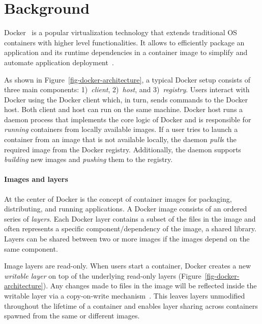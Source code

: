 \section{Background}
\label{sec:background}

Docker~\cite{docker} is a popular virtualization technology
that extends traditional OS containers with higher level
functionalities.
%
It allows to efficiently package an application and its runtime dependencies
in a container image to simplify and automate application deployment~\cite{slacker}.
%
%

%
As shown in Figure~\ref{fig-docker-architecture}, a typical
Docker setup consists of three main components: 1)~\emph{client},
2)~\emph{host}, and 3)~\emph{registry}.
%
Users interact with Docker using the Docker client which, in turn,
sends commands to the Docker host.
%
Both client and host can run on the same machine.
%
Docker host runs a daemon process that implements the core logic of Docker and
is responsible for \emph{running} containers from locally available
images.
%
If a user tries to launch a container from an image that is not available
locally, the daemon \emph{pull}s the required image from the Docker registry.
%
Additionally, the daemon supports \emph{building} new images and \emph{pushing}
them to the registry.

\paragraph{Images and layers}
%
At the center of Docker is the concept of container images for packaging,
distributing, and running applications.
%
A Docker image consists of an ordered series of \emph{layers}.
%
Each Docker layer contains a subset of the files in the image and often represents a
specific component/dependency of the image, \eg a shared library.
%
Layers can be shared between two or more images if
the images depend on the same component.

Image layers are read-only.
%
When users start a container, Docker creates a new
\emph{writable layer} on top of the underlying read-only layers
(Figure~\ref{fig-docker-architecture}).
%
Any changes made to files in the image will be reflected inside the writable
layer via a copy-on-write mechanism~\cite{docker-driver-eval}.
%
This leaves layers unmodified throughout the lifetime of a container and
enables layer sharing across containers spawned from the same or different images.
%
%

